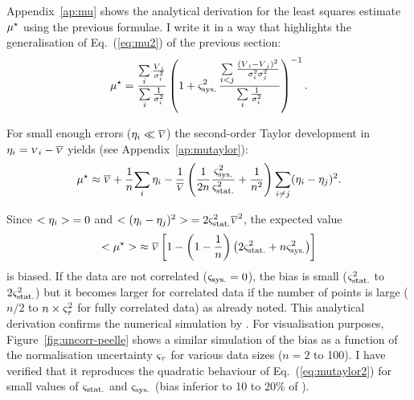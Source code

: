 \documentclass{pasa}
\begin{document}
Appendix~\ref{ap:mu} shows the analytical derivation for the least squares estimate $\mu^\star$ using the previous formulae. I write it in a way that highlights the generalisation of Eq.~(\ref{eq:mu2}) of the previous section:
\begin{equation}
  \mu^\star = 
    \frac{\sum\limits_{i} \frac{{\scriptstyle V}_i}{\sigma_i^2}}{\sum\limits_i \frac{1}{\sigma_i^2}}
    \left( 1 + \varsigma_\text{sys.}^2\,\frac
            {\sum\limits_{i<j} \frac{({\scriptstyle V}_i-{\scriptstyle V}_j)^2}{\sigma_i^2\sigma_j^2}} 
            {\sum\limits_i \frac{1}{\sigma_i^2}}
        \right)^{-1}.
    \label{eq:mu}
\end{equation}

For small enough errors ($\eta_i \ll \overline{{\scriptstyle V}}$) the second-order Taylor development in $\eta_i = {\scriptstyle V}_i - \overline{{\scriptstyle V}}$ yields (see Appendix~\ref{ap:mutaylor}): 
\begin{equation}
    \mu^\star \approx 
        \overline{{\scriptstyle V}}
      + \frac1n {\sum\limits_i \eta_i}
      - \frac 1{\overline{{\scriptstyle V}}} 
        \left(\frac1{2n}\frac{\varsigma_\text{sys.}^2}{\varsigma_\text{stat.}^2}  + \frac 1{n^2}\right) 
      \sum\limits_{i\ne j} (\eta_i-\eta_j)^2.
    \label{eq:mutaylor}
\end{equation}

Since $ {<\eta_i>}  = 0$ and $ {<(\eta_i-\eta_j)^2>}  = 2\varsigma_\text{stat.}^2\overline{{\scriptstyle V}}^2$, the expected value
\begin{equation}
     {<\ensuremath{\mu}^\star>}   \approx \overline{{\scriptstyle V}} 
            \left[ 1 -  
               \left(1-\frac1n\right)
               \left(2\varsigma_\text{stat.}^2 + n\varsigma_\text{sys.}^2\right)
               \right]
    \label{eq:mutaylor2}
\end{equation}
is biased.  If the data are not correlated ($\varsigma_\text{sys.} = 0$), the bias is small
($\varsigma_\text{stat.}^2$ to $2\varsigma_\text{stat.}^2$) but it becomes larger for correlated data if the number of points is large ($n/2$ to $n \times \varsigma_\tau^2$ for fully correlated data) as \citet{DAG94} already noted. This analytical derivation confirms the numerical simulation by \citet[][see their Fig.~4]{NEU12}. For visualisation purposes, Figure~\ref{fig:uncorr-peelle} shows a similar simulation of the bias as a function of the normalisation uncertainty $\varsigma_\tau$ for various data sizes ($n = 2$ to 100). I have verified that it reproduces the quadratic behaviour of Eq.~(\ref{eq:mutaylor2}) for small values of $\varsigma_\text{stat.}$ and $\varsigma_\text{sys.}$ (bias inferior to 10 to 20\% of \datamean).
\end{document}
